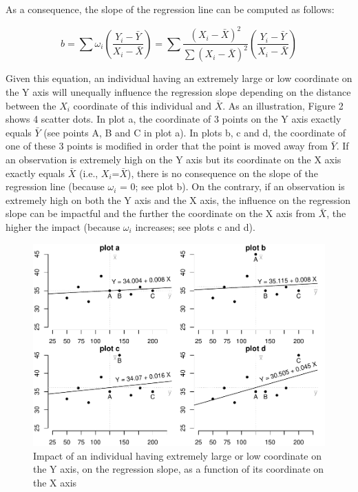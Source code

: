 \documentclass[man,floatsintext]{apa6}
\begin{document}
As a consequence, the slope of the regression line can be computed as
follows:

\begin{equation} 
b=\sum\omega_i\left(\frac{Y_i-\bar{Y}}{ X_i-\bar{X}}\right)= \sum \frac{(X_i-\bar{X})^2}{\sum(X_i-\bar{X})^2} \left(\frac{Y_i-\bar{Y}}{X_i-\bar{X}}\right)
\label{eq:regressionslope}
\end{equation}

Given this equation, an individual having an extremely large or low
coordinate on the Y axis will unequally influence the regression slope
depending on the distance between the \(X_i\) coordinate of this
individual and \(\bar{X}\). As an illustration, Figure 2 shows 4 scatter
dots. In plot a, the coordinate of 3 points on the Y axis exactly equals
\(\bar{Y}\) (see points A, B and C in plot a). In plots b, c and d, the
coordinate of one of these 3 points is modified in order that the point
is moved away from \(\bar{Y}\). If an observation is extremely high on
the Y axis but its coordinate on the X axis exactly equals \(\bar{X}\)
(i.e., \(X_i\)=\(\bar{X}\)), there is no consequence on the slope of the
regression line (because \(\omega_i\) = 0; see plot b). On the contrary,
if an observation is extremely high on both the Y axis and the X axis,
the influence on the regression slope can be impactful and the further
the coordinate on the X axis from \(\bar{X}\), the higher the impact
(because \(\omega_i\) increases; see plots c and d).

\begin{figure}
\centering
\includegraphics{Outliers_files/figure-latex/outimpact-1.pdf}
\caption{\label{fig:outimpact}Impact of an individual having extremely large
or low coordinate on the Y axis, on the regression slope, as a function
of its coordinate on the X axis}
\end{figure}
\end{document}
